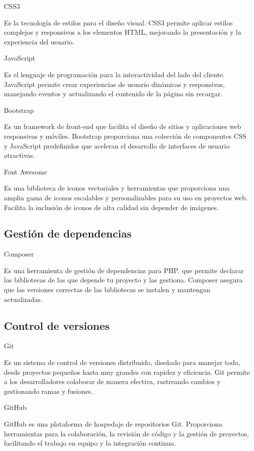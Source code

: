 CSS3

Es la tecnología de estilos para el diseño visual.
CSS3 permite aplicar estilos complejos y responsivos a los elementos HTML, mejorando la presentación y la experiencia
del usuario.

JavaScript

Es el lenguaje de programación para la interactividad del lado del cliente.
JavaScript permite crear experiencias de usuario dinámicas y responsivas, manejando eventos y actualizando el contenido
de la página sin recargar.

Bootstrap

Es un framework de front-end que facilita el diseño de sitios y aplicaciones web
responsivas y móviles.
Bootstrap proporciona una colección de componentes CSS
y JavaScript predefinidos que aceleran el desarrollo de interfaces de usuario atractivas.

Font Awesome

Es una biblioteca de iconos vectoriales y herramientas que proporciona una amplia gama de
iconos escalables y personalizables para su uso en proyectos web.
Facilita la inclusión de iconos de alta calidad sin depender de imágenes.

\subsection{Gestión de dependencias}

Composer

Es una herramienta de gestión de dependencias para PHP, que
permite declarar las bibliotecas de las que depende tu proyecto
y las gestiona.
Composer asegura que las versiones correctas de las bibliotecas se instalen y mantengan actualizadas.

\subsection{Control de versiones}

Git

Es un sistema de control de versiones distribuido, diseñado para manejar todo, desde proyectos
pequeños hasta muy grandes con rapidez y eficiencia.
Git permite a los desarrolladores colaborar de manera efectiva, rastreando cambios y gestionando ramas y fusiones.


GitHub

GitHub es una plataforma de hospedaje de repositorios Git.
Proporciona herramientas para la colaboración, la revisión de código y la gestión de proyectos, facilitando el trabajo
en equipo y la integración continua.

